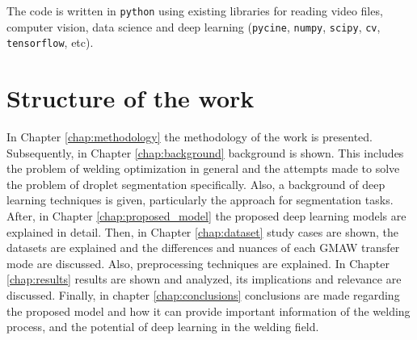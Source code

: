 \begin{intro}
The code is written in \texttt{python} using existing libraries for reading video files, computer vision, data science and deep learning (\texttt{pycine}, \texttt{numpy}, \texttt{scipy}, \texttt{cv}, \texttt{tensorflow}, etc).

\section{Structure of the work}

In Chapter \ref{chap:methodology} the methodology of the work is presented. Subsequently, in Chapter \ref{chap:background} background is shown. This includes the problem of welding optimization in general and the attempts made to solve the problem of droplet segmentation specifically. Also, a background of deep learning techniques is given, particularly the approach for segmentation tasks. After, in Chapter \ref{chap:proposed_model} the proposed deep learning models are explained in detail. Then, in Chapter \ref{chap:dataset} study cases are shown, the datasets are explained and the differences and nuances of each GMAW transfer mode are discussed. Also, preprocessing techniques are explained. In Chapter \ref{chap:results} results are shown and analyzed, its implications and relevance are discussed. Finally, in chapter \ref{chap:conclusions} conclusions are made regarding the proposed model and how it can provide important information of the welding process, and the potential of deep learning in the welding field.


\end{intro}